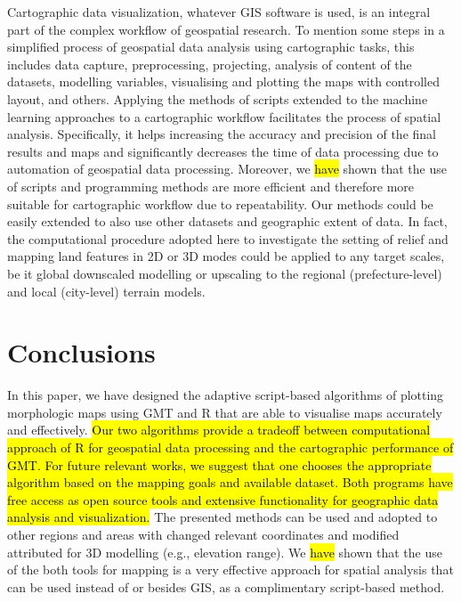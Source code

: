\documentclass[land,article,submit,pdftex,moreauthors]{Definitions/mdpi}
\begin{document}
Cartographic data visualization, whatever GIS software is used, is an integral part of the complex workflow of geospatial research. To mention some steps in a simplified process of geospatial data analysis using cartographic tasks, this includes data capture, preprocessing, projecting, analysis of content of the datasets, modelling variables, visualising and plotting the maps with controlled layout, and others. Applying the methods of scripts extended to the machine learning approaches to a cartographic workflow facilitates the process of spatial analysis. Specifically, it helps increasing the accuracy and precision of the final results and maps and significantly decreases the time of data processing due to automation of geospatial data processing. Moreover, we \hl{have }shown that the use of scripts and programming methods are more efficient and therefore more suitable for cartographic workflow due to repeatability. Our methods could be easily extended to also use other datasets and geographic extent of data. In fact, the computational procedure adopted here to investigate the setting of relief and mapping land features in 2D or 3D modes could be applied to any target scales, be it global downscaled modelling or upscaling to the regional (prefecture-level) and local (city-level)  terrain models. 


\section{Conclusions}

In this paper, we have designed the adaptive script-based algorithms of plotting morphologic maps using GMT and R that are able to visualise maps accurately and effectively. \hl{Our two algorithms provide a tradeoff between computational approach of R for geospatial data processing and the cartographic performance of GMT. For future relevant works, we suggest that one chooses the appropriate algorithm based on the mapping goals and available dataset. Both programs have free access as open source tools and extensive functionality for geographic data analysis and visualization.} The presented methods can be used and adopted to other regions and areas with changed relevant coordinates and modified attributed for 3D modelling (e.g., elevation range). We \hl{have }shown that the use of the both tools for mapping is a very effective approach for spatial analysis that can be used instead of or besides GIS, as a complimentary script-based method. 
\end{document}

